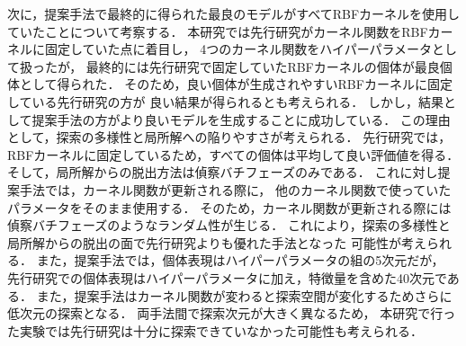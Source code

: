 次に，提案手法で最終的に得られた最良のモデルがすべてRBFカーネルを使用していたことについて考察する．
本研究では先行研究がカーネル関数をRBFカーネルに固定していた点に着目し，
4つのカーネル関数をハイパーパラメータとして扱ったが，
最終的には先行研究で固定していたRBFカーネルの個体が最良個体として得られた．
そのため，良い個体が生成されやすいRBFカーネルに固定している先行研究の方が
良い結果が得られるとも考えられる．
しかし，結果として提案手法の方がより良いモデルを生成することに成功している．
この理由として，探索の多様性と局所解への陥りやすさが考えられる．
先行研究では，RBFカーネルに固定しているため，すべての個体は平均して良い評価値を得る．
そして，局所解からの脱出方法は偵察バチフェーズのみである．
これに対し提案手法では，カーネル関数が更新される際に，
他のカーネル関数で使っていたパラメータをそのまま使用する．
そのため，カーネル関数が更新される際には偵察バチフェーズのようなランダム性が生じる．
これにより，探索の多様性と局所解からの脱出の面で先行研究よりも優れた手法となった
可能性が考えられる．
また，提案手法では，個体表現はハイパーパラメータの組の5次元だが，
先行研究での個体表現はハイパーパラメータに加え，特徴量を含めた40次元である．
また，提案手法はカーネル関数が変わると探索空間が変化するためさらに低次元の探索となる．
両手法間で探索次元が大きく異なるため，
本研究で行った実験では先行研究は十分に探索できていなかった可能性も考えられる．
